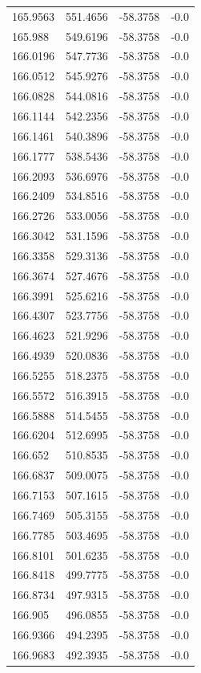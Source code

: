 \begin{table}[H]
\begin{tabular}{llll}
165.9563 & 551.4656 & -58.3758 & -0.0 \\
165.988 & 549.6196 & -58.3758 & -0.0 \\
166.0196 & 547.7736 & -58.3758 & -0.0 \\
166.0512 & 545.9276 & -58.3758 & -0.0 \\
166.0828 & 544.0816 & -58.3758 & -0.0 \\
166.1144 & 542.2356 & -58.3758 & -0.0 \\
166.1461 & 540.3896 & -58.3758 & -0.0 \\
166.1777 & 538.5436 & -58.3758 & -0.0 \\
166.2093 & 536.6976 & -58.3758 & -0.0 \\
166.2409 & 534.8516 & -58.3758 & -0.0 \\
166.2726 & 533.0056 & -58.3758 & -0.0 \\
166.3042 & 531.1596 & -58.3758 & -0.0 \\
166.3358 & 529.3136 & -58.3758 & -0.0 \\
166.3674 & 527.4676 & -58.3758 & -0.0 \\
166.3991 & 525.6216 & -58.3758 & -0.0 \\
166.4307 & 523.7756 & -58.3758 & -0.0 \\
166.4623 & 521.9296 & -58.3758 & -0.0 \\
166.4939 & 520.0836 & -58.3758 & -0.0 \\
166.5255 & 518.2375 & -58.3758 & -0.0 \\
166.5572 & 516.3915 & -58.3758 & -0.0 \\
166.5888 & 514.5455 & -58.3758 & -0.0 \\
166.6204 & 512.6995 & -58.3758 & -0.0 \\
166.652 & 510.8535 & -58.3758 & -0.0 \\
166.6837 & 509.0075 & -58.3758 & -0.0 \\
166.7153 & 507.1615 & -58.3758 & -0.0 \\
166.7469 & 505.3155 & -58.3758 & -0.0 \\
166.7785 & 503.4695 & -58.3758 & -0.0 \\
166.8101 & 501.6235 & -58.3758 & -0.0 \\
166.8418 & 499.7775 & -58.3758 & -0.0 \\
166.8734 & 497.9315 & -58.3758 & -0.0 \\
166.905 & 496.0855 & -58.3758 & -0.0 \\
166.9366 & 494.2395 & -58.3758 & -0.0 \\
166.9683 & 492.3935 & -58.3758 & -0.0 \\

\end{tabular}
\end{table}
